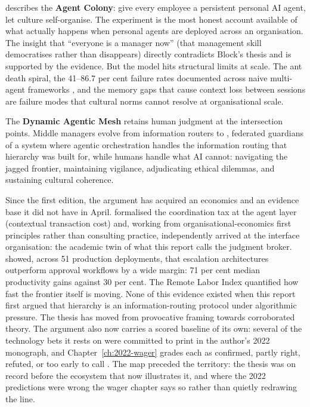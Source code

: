 \textcite{Shipper2026} describes the \textbf{Agent Colony}: give every employee a persistent personal AI agent, let culture self-organise. The experiment is the most honest account available of what actually happens when personal agents are deployed across an organisation. The insight that ``everyone is a manager now'' (that management skill democratises rather than disappears) directly contradicts Block's thesis and is supported by the evidence. But the model hits structural limits at scale. The ant death spiral, the 41--86.7 per cent failure rates documented across naive multi-agent frameworks \parencite{Cemri2025}, and the memory gaps that cause context loss between sessions are failure modes that cultural norms cannot resolve at organisational scale.

The \textbf{Dynamic Agentic Mesh} retains human judgment at the intersection points. Middle managers evolve from information routers to , federated guardians of a system where agentic orchestration handles the information routing that hierarchy was built for, while humans handle what AI cannot: navigating the jagged frontier, maintaining vigilance, adjudicating ethical dilemmas, and sustaining cultural coherence.

Since the first edition, the argument has acquired an economics and an evidence base it did not have in April. \textcite{Liu2026} formalised the coordination tax at the agent layer (contextual transaction cost) and, working from organisational-economics first principles rather than consulting practice, independently arrived at the interface organisation: the academic twin of what this report calls the judgment broker. \textcite{Pereira2026Playbook} showed, across 51 production deployments, that escalation architectures outperform approval workflows by a wide margin: 71 per cent median productivity gains against 30 per cent. The Remote Labor Index \parencite{CAIS2026RLI} quantified how fast the frontier itself is moving. None of this evidence existed when this report first argued that hierarchy is an information-routing protocol under algorithmic pressure. The thesis has moved from provocative framing towards corroborated theory. The argument also now carries a scored baseline of its own: several of the technology bets it rests on were committed to print in the author's 2022 monograph, and Chapter~\ref{ch:2022-wager} grades each as confirmed, partly right, refuted, or too early to call \parencite{OHare2022Convergence}. The map preceded the territory: the thesis was on record before the ecosystem that now illustrates it, and where the 2022 predictions were wrong the wager chapter says so rather than quietly redrawing the line.

